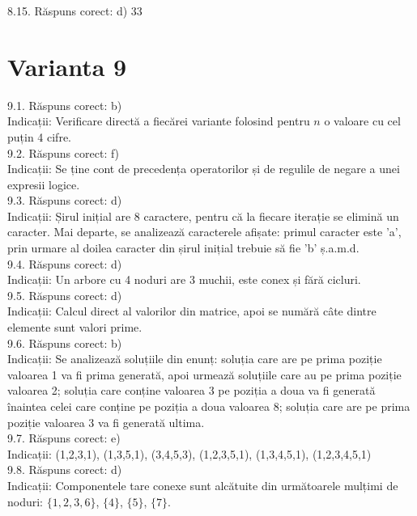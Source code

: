 8.15. Răspuns corect: d) 33\\

\section*{Varianta 9}

9.1. Răspuns corect: b)\\
Indicații: Verificare directă a fiecărei variante folosind pentru $n$ o valoare cu cel puțin 4 cifre.\\

9.2. Răspuns corect: f)\\
Indicații: Se ține cont de precedența operatorilor și de regulile de negare a unei expresii logice.\\

9.3. Răspuns corect: d)\\
Indicații: Șirul inițial are 8 caractere, pentru că la fiecare iterație se elimină un caracter. Mai departe, se analizează caracterele afișate: primul caracter este 'a', prin urmare al doilea caracter din șirul inițial trebuie să fie 'b' ș.a.m.d.\\

9.4. Răspuns corect: d)\\
Indicații: Un arbore cu 4 noduri are 3 muchii, este conex și fără cicluri.\\

9.5. Răspuns corect: d)\\
Indicații: Calcul direct al valorilor din matrice, apoi se numără câte dintre elemente sunt valori prime.\\

9.6. Răspuns corect: b)\\
Indicații: Se analizează soluțiile din enunț: soluția care are pe prima poziție valoarea 1 va fi prima generată, apoi urmează soluțiile care au pe prima poziție valoarea 2; soluția care conține valoarea 3 pe poziția a doua va fi generată înaintea celei care conține pe poziția a doua valoarea 8; soluția care are pe prima poziție valoarea 3 va fi generată ultima.\\

9.7. Răspuns corect: e)\\
Indicații: (1,2,3,1), (1,3,5,1), (3,4,5,3), (1,2,3,5,1), (1,3,4,5,1), (1,2,3,4,5,1)\\

9.8. Răspuns corect: d)\\
Indicații: Componentele tare conexe sunt alcătuite din următoarele mulțimi de noduri: $\{1,2,3,6\}$, $\{4\}$, $\{5\}$, $\{7\}$.\\

